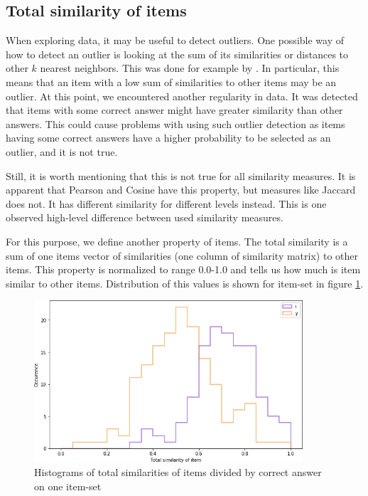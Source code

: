 \documentclass[
  digital, %
  table,   %
  nolof,     %
  nolot,     %
  nocover,
  color,
  final, %
]{fithesis3}
\begin{document}

\subsection{Total similarity of items}\label{total-similarity-of-items}

When exploring data, it may be useful to detect outliers. One possible way of how to detect an outlier is looking at the sum of its similarities or distances to other $k$ nearest neighbors. This was done for example by \citeauthor{zhang2006detecting}\cite{zhang2006detecting}. In particular, this means that an item with a low sum of similarities to other items may be an outlier. At this point, we encountered another regularity in data. It was detected that items with some correct answer might have greater similarity than other answers. This could cause problems with using such outlier detection as items having some correct answers have a higher probability to be selected as an outlier, and it is not true.

Still, it is worth mentioning that this is not true for all similarity measures. It is apparent that Pearson and Cosine have this property, but measures like Jaccard does not. It has different similarity for different levels instead. This is one observed high-level difference between used similarity measures.


For this purpose, we define another property of items. The total similarity is a sum of one items vector of similarities (one column of similarity matrix) to other items. This property is normalized to range 0.0-1.0 and tells us how much is item similar to other items. Distribution of this values is shown for item-set \cviceniB{} in figure \ref{fig:histogram_i_y}.

\begin{figure}
  \includegraphics[width=10cm]{img/histogram_i_y}
  \caption{Histograms of total similarities of items divided by correct answer on one item-set}
  \label{fig:histogram_i_y}
\end{figure}
\end{document}
